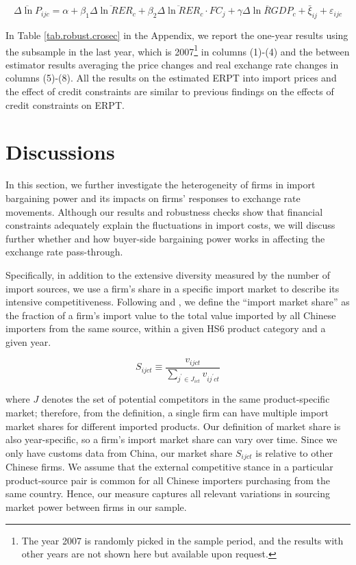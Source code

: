 \begin{equation}
	\overline{\Delta \ln P}_{ijc}=\alpha+\beta_{1} \overline{\Delta \ln RER}_{c}+\beta_{2} \overline{\Delta \ln RER}_{c} \cdot FC_{j}+\gamma \overline{\Delta \ln RGDP}_{c}+\bar{\xi}_{ij} +\varepsilon_{ijc}
	\label{eq.credit.crosec}
\end{equation}

In Table \ref{tab.robust.crosec} in the Appendix, we report the one-year results using the subsample in the last year, which is 2007\footnote{The year 2007 is randomly picked in the sample period, and the results with other years are not shown here but available upon request.} in columns (1)-(4) and the between estimator results averaging the price changes and real exchange rate changes in columns (5)-(8). All the results on the estimated ERPT into import prices and the effect of credit constraints are similar to previous findings on the effects of credit constraints on ERPT.

\section{Discussions} \label{Discussion}

In this section, we further investigate the heterogeneity of firms in import bargaining power and its impacts on firms’ responses to exchange rate movements. Although our results and robustness checks show that financial constraints adequately explain the fluctuations in import costs, we will discuss further whether and how buyer-side bargaining power works in affecting the exchange rate pass-through.

Specifically, in addition to the extensive diversity measured by the number of import sources, we use a firm's share in a specific import market to describe its intensive competitiveness. Following \cite{aik2014} and \cite{devereux2017}, we define the ``import market share'' as the fraction of a firm's import value to the total value imported by all Chinese importers from the same source, within a given HS6 product category and a given year. 

$$
S_{ijct} \equiv \frac{v_{ijct}}{\sum_{j^{\prime} \in J_{ict}} v_{ij^{\prime}ct}}
$$

where $J$ denotes the set of potential competitors in the same product-specific market; therefore, from the definition, a single firm can have multiple import market shares for different imported products. Our definition of market share is also year-specific, so a firm’s import market share can vary over time. Since we only have customs data from China, our market share $S_{ijct}$ is relative to other Chinese firms. We assume that the external competitive stance in a particular product-source pair is common for all Chinese importers purchasing from the same country. Hence, our measure captures all relevant variations in sourcing market power between firms in our sample.

